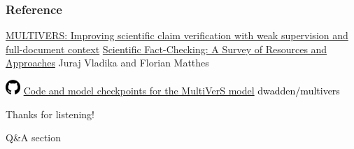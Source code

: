 \documentclass[13.5pt,aspecratio=169, xcolor=dvipsnames]{beamer}
\begin{document}
 


                

\onehalfspacing
\begin{frame} %
	\frametitle{Reference}
	
	\begin{thebibliography}{99} %
		\footnotesize %
		
			\href{https://aclanthology.org/2022.findings-naacl.6}{MULTIVERS: Improving scientific claim verification with
            weak supervision and full-document context}
        \href{https://aclanthology.org/2023.findings-acl.387.pdf}{Scientific Fact-Checking: A Survey of Resources and Approaches}
			\newblock Juraj Vladika and Florian Matthes
		
        \hspace{-1.9em}\includegraphics[width=1.5em]{Icons/github.png}
        \textcolor{blue}{\href{https://github.com/ragavsachdeva/The-Change-You-Want-to-See/tree/main?fbclid=IwAR0LKUHmVIEYSDTCgl2KeV5jir1pUlMSYJTbHbirilqWH_eZ4N9FxHwTQto\#datasets}{Code and model checkpoints for the MultiVerS model}}
          \newblock \textcolor{black}{dwadden/multivers}
	\end{thebibliography}
\end{frame}




\begin{frame} %
	\begin{center}
		{\Huge Thanks for listening!}
		
		\bigskip\bigskip %
		
		{\LARGE Q\&A section}
	\end{center}
\end{frame}
\end{document}
